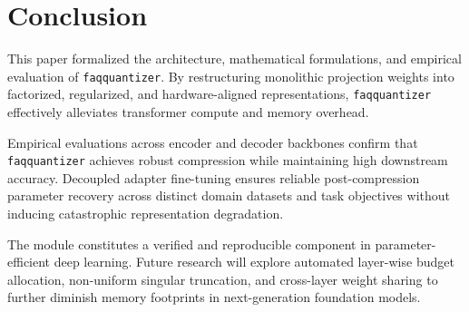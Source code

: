 \section{Conclusion}
This paper formalized the architecture, mathematical formulations, and empirical evaluation of \texttt{faqquantizer}. By restructuring monolithic projection weights into factorized, regularized, and hardware-aligned representations, \texttt{faqquantizer} effectively alleviates transformer compute and memory overhead.

Empirical evaluations across encoder and decoder backbones confirm that \texttt{faqquantizer} achieves robust compression while maintaining high downstream accuracy. Decoupled adapter fine-tuning ensures reliable post-compression parameter recovery across distinct domain datasets and task objectives without inducing catastrophic representation degradation.

The module constitutes a verified and reproducible component in parameter-efficient deep learning. Future research will explore automated layer-wise budget allocation, non-uniform singular truncation, and cross-layer weight sharing to further diminish memory footprints in next-generation foundation models.
